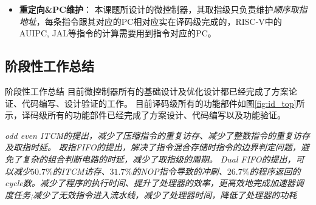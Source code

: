 \documentclass[a4paper, 12pt]{article}
\begin{document}
\begin{itemize}
    \item \textbf{重定向\&PC维护}：
      本课题所设计的微控制器，其取指级只负责维护\textit{顺序取指地址}，每条指令跟其对应的PC相对应实在译码级完成的，RISC-V中的AUIPC, JAL等指令的计算需要用到指令对应的PC。



  \end{itemize}  
\subsection{阶段性工作总结}
阶段性工作总结  
  目前微控制器所有的基础设计及优化设计都已经完成了方案论证、代码编写、设计验证的工作。
  目前译码级所有的功能部件如图\ref{fig:id_top}所示，译码级所有的功能部件已经完成了方案设计、代码编写以及功能验证。

    \textit{odd even ITCM的提出，减少了压缩指令的重复访存、减少了整数指令的重复访存及取指时延。}
    \textit{取指FIFO的提出，解决了指令混合存储时指令的边界判定问题，避免了复杂的组合判断电路的时延，减少了取指级的周期。}
    \textit{Dual FIFO的提出，可以减少$50.7\%$的ITCM访存、$31.7\%$的NOP指令导致的冲刷、$26.7\%$的程序返回的cycle数。减少了程序的执行时间、提升了处理器的效率，更高效地完成加速器调度任务;减少了无效指令进入流水线，减少了处理器时间，降低了处理器的功耗\cite{9613880}}
\end{document}
